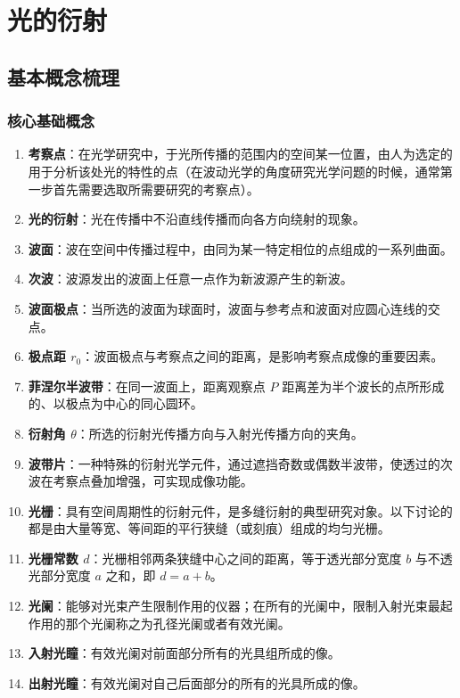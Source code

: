 \documentclass{article}
\begin{document}
	\section{ 光的衍射}
	
	\subsection{基本概念梳理}
	
	\subsubsection{核心基础概念}
	\begin{enumerate}[label=\arabic*.]
		\item \textbf{考察点}：在光学研究中，于光所传播的范围内的空间某一位置，由人为选定的用于分析该处光的特性的点（在波动光学的角度研究光学问题的时候，通常第一步首先需要选取所需要研究的考察点）。
		\item \textbf{光的衍射}：光在传播中不沿直线传播而向各方向绕射的现象。
		\item \textbf{波面}：波在空间中传播过程中，由同为某一特定相位的点组成的一系列曲面。
		\item \textbf{次波}：波源发出的波面上任意一点作为新波源产生的新波。
		\item \textbf{波面极点}：当所选的波面为球面时，波面与参考点和波面对应圆心连线的交点。
		\item \textbf{极点距 \(r_0\)}：波面极点与考察点之间的距离，是影响考察点成像的重要因素。
		\item \textbf{菲涅尔半波带}：在同一波面上，距离观察点 \(P\) 距离差为半个波长的点所形成的、以极点为中心的同心圆环。
		\item \textbf{衍射角 \(\theta\)}：所选的衍射光传播方向与入射光传播方向的夹角。
		\item \textbf{波带片}：一种特殊的衍射光学元件，通过遮挡奇数或偶数半波带，使透过的次波在考察点叠加增强，可实现成像功能。
		\item \textbf{光栅}：具有空间周期性的衍射元件，是多缝衍射的典型研究对象。以下讨论的都是由大量等宽、等间距的平行狭缝（或刻痕）组成的均匀光栅。
		\item \textbf{光栅常数 \(d\)}：光栅相邻两条狭缝中心之间的距离，等于透光部分宽度 \(b\) 与不透光部分宽度 \(a\) 之和，即 \(d = a + b\)。
		\item \textbf{光阑}：能够对光束产生限制作用的仪器；在所有的光阑中，限制入射光束最起作用的那个光阑称之为孔径光阑或者有效光阑。
		\item \textbf{入射光瞳}：有效光阑对前面部分所有的光具组所成的像。
		\item \textbf{出射光瞳}：有效光阑对自己后面部分的所有的光具所成的像。
	\end{enumerate}
	
\end{document}
